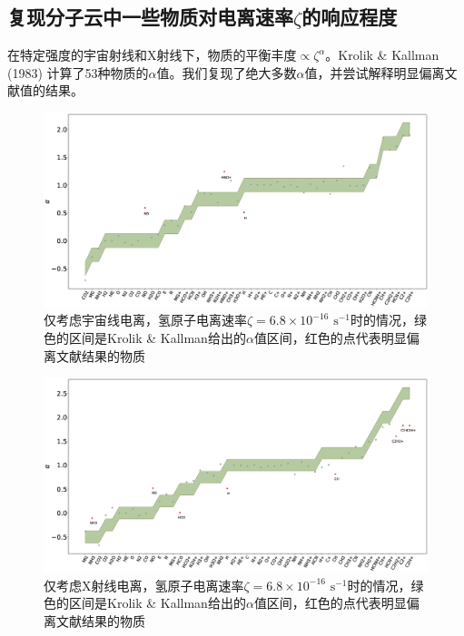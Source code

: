 \documentclass[UTF8]{article}
\begin{document}
\begin{fangsong}
\section{复现分子云中一些物质对电离速率$\zeta$的响应程度}
在特定强度的宇宙射线和X射线下，物质的平衡丰度$\propto\zeta^\alpha$。Krolik \& Kallman (1983) 计算了53种物质的$\alpha$值。我们复现了绝大多数$\alpha$值，并尝试解释明显偏离文献值的结果。
\begin{figure}[H]
	\centering
	\includegraphics[width=\textwidth]{Table2.eps}
	\caption{仅考虑宇宙线电离，氢原子电离速率$\zeta=6.8\times10^{-16}\text{ s}^{-1}$时的情况，绿色的区间是Krolik \& Kallman给出的$\alpha$值区间，红色的点代表明显偏离文献结果的物质}
\end{figure}
\begin{figure}[H]
	\centering
	\includegraphics[width=\textwidth]{Table4.eps}
	\caption{仅考虑X射线电离，氢原子电离速率$\zeta=6.8\times10^{-16}\text{ s}^{-1}$时的情况，绿色的区间是Krolik \& Kallman给出的$\alpha$值区间，红色的点代表明显偏离文献结果的物质}
\end{figure}
\end{fangsong}
\end{document}
